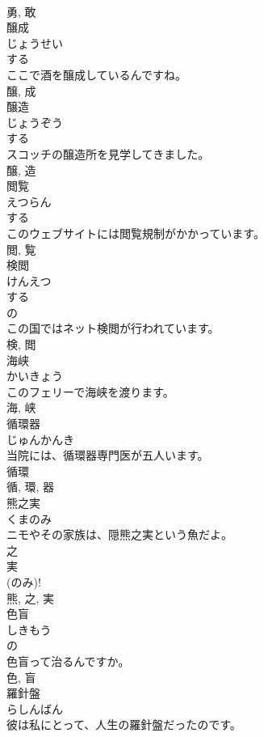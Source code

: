 \documentclass[8pt]{extreport}
\begin{document}
\begin{CJK}{UTF8}{min}
\\	勇, 敢	
\\	醸成	
\\	じょうせい	
\\	する 
\\	ここで酒を醸成しているんですね。	
\\	醸, 成	
\\	醸造	
\\	じょうぞう	
\\	する 
\\	スコッチの醸造所を見学してきました。	
\\	醸, 造	
\\	閲覧	
\\	えつらん	
\\	する 
\\	このウェブサイトには閲覧規制がかかっています。	
\\	閲, 覧	
\\	検閲	
\\	けんえつ	
\\	する 
\\	の 
\\	この国ではネット検閲が行われています。	
\\	検, 閲	
\\	海峡	
\\	かいきょう	
\\	このフェリーで海峡を渡ります。	
\\	海, 峡	
\\	循環器	
\\	じゅんかんき	
\\	当院には、循環器専門医が五人います。	
\\	循環 
\\	循, 環, 器	
\\	熊之実	
\\	くまのみ	
\\	ニモやその家族は、隠熊之実という魚だよ。	
\\	之 
\\	実 
\\	(のみ)! 
\\	熊, 之, 実	
\\	色盲	
\\	しきもう	
\\	の 
\\	色盲って治るんですか。	
\\	色, 盲	
\\	羅針盤	
\\	らしんばん	
\\	彼は私にとって、人生の羅針盤だったのです。	

\end{CJK}
\end{document}
